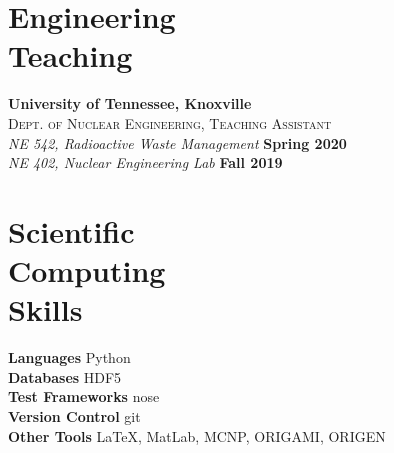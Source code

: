 \documentclass[margin,line]{resume}
\begin{document}
\begin{resume}
    \section{\mysidestyle Engineering\\Teaching}
    \textbf{University of Tennessee, Knoxville}\\
    \textsc{Dept. of Nuclear Engineering, Teaching Assistant}\\
               \textsl{NE 542, Radioactive Waste Management} \hfill \textbf{Spring 2020}\\
               \textsl{NE 402, Nuclear Engineering Lab} \hfill \textbf{Fall 2019}
               \vspace{2mm}
    \section{\mysidestyle Scientific\\Computing\\Skills}
                \textbf{Languages} \hfill Python \vspace{.5mm}\\%
                \textbf{Databases} \hfill HDF5 \vspace{.5mm}\\%
                \textbf{Test Frameworks} \hfill nose\vspace{.5mm}\\%
                \textbf{Version Control} \hfill git \vspace{.5mm}\\%
                \textbf{Other Tools} \hfill \LaTeX, MatLab, MCNP, ORIGAMI, ORIGEN \vspace{.5mm}%

\end{resume}
\end{document}
